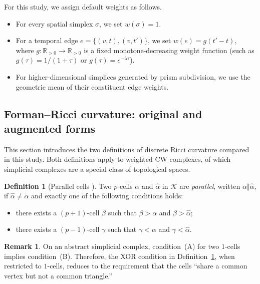 \documentclass[
    pre,
    twocolumn,
    superscriptaddress,
    showpacs,
    nofootinbib,
    amsmath,
    amssymb,
    floatfix
]{revtex4-2}
\newcommand{\R}{\mathbb{R}}
\newcommand{\K}{\mathcal{K}}
\theoremstyle{plain} %
\theoremstyle{definition} %
\newtheorem{definition}{\indent Definition}
\newtheorem{remark}{\indent Remark}
\begin{document}
For this study, we assign default weights as follows.
\begin{itemize}
    \item For every spatial simplex $\sigma$, we set $w(\sigma)=1$.
    \item For a temporal edge $e=\{(v,t),(v,t')\}$, we set $w(e)=g(t'-t)$, where $g\colon\R_{>0}\to\R_{>0}$ is a fixed monotone-decreasing weight function (such as $g(\tau)=1/(1+\tau)$ or $g(\tau)=e^{-\lambda\tau}$). 
    \item For higher-dimensional simplices generated by prism subdivision, we use the geometric mean of their constituent edge weights.
\end{itemize}

\subsection{Forman--Ricci curvature: original and augmented forms}\label{ssec:forman}

This section introduces the two definitions of discrete Ricci curvature compared in this study. 
Both definitions apply to weighted CW complexes, of which simplicial complexes are a special class of topological spaces.

\begin{definition}[Parallel cells \cite{Forman2003}]\label{def:parallel}
Two $p$-cells $\alpha$ and $\hat\alpha$ in $\K$ are
\emph{parallel}, written $\alpha\Vert\hat\alpha$, if
$\hat\alpha\neq\alpha$ and exactly one of the following conditions
holds:
\begin{itemize}
    \item[\textnormal{(A)}] there exists a $(p+1)$-cell $\beta$ such that
          $\beta>\alpha$ and $\beta>\hat\alpha$;
    \item[\textnormal{(B)}] there exists a $(p-1)$-cell $\gamma$
          such that $\gamma<\alpha$ and $\gamma<\hat\alpha$.
\end{itemize}
\end{definition}
\begin{remark}\label{rem:parallel_simplicial}
On an abstract simplicial complex, condition~(A) for two $1$-cells implies condition~(B). Therefore, the XOR condition in Definition~\ref{def:parallel}, when restricted to $1$-cells, reduces to the requirement that the cells ``share a common vertex but not a common triangle.''
\end{remark}
\end{document}
